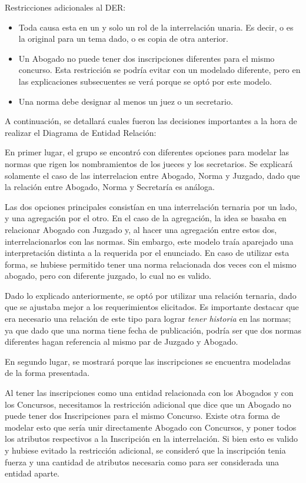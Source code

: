 Restricciones adicionales al DER:

\begin{itemize}
\item Toda causa esta en un y solo un rol de la interrelación unaria. Es decir, o es la original para un tema dado, o es copia de otra anterior.
\item Un Abogado no puede tener dos inscripciones diferentes para el mismo concurso. Esta restricción se podría evitar con un modelado diferente, pero en las explicaciones subsecuentes se verá porque se optó por este modelo.
\item Una norma debe designar al menos un juez o un secretario.
\end{itemize}



A continuación, se detallará cuales fueron las decisiones importantes a la hora de realizar el Diagrama de Entidad Relación:


En primer lugar, el grupo se encontró con diferentes opciones para modelar las normas que rigen los nombramientos de los jueces y los secretarios. 
Se explicará solamente el caso de las interrelacion entre Abogado, Norma y Juzgado, dado que la relación entre Abogado, Norma y Secretaría es análoga.

Las dos opciones principales consistían en una interrelación ternaria por un lado, y una agregación por el otro.
En el caso de la agregación, la idea se basaba en relacionar Abogado con Juzgado y, al hacer una agregación entre estos dos, interrelacionarlos con las normas. Sin embargo, este modelo traía aparejado una interpretación distinta a la requerida por el enunciado. En caso de utilizar esta forma, se hubiese permitido tener una norma relacionada dos veces con el mismo abogado, pero con diferente juzgado, lo cual no es valido. 

Dado lo explicado anteriormente, se optó por utilizar una relación ternaria, dado que se ajustaba mejor a los requerimientos elicitados. 
Es importante destacar que era necesario una relación de este tipo para lograr \textit{tener historia} en las normas; ya que dado que una norma tiene fecha de publicación, podría ser que dos normas diferentes hagan referencia al mismo par de Juzgado y Abogado.


\bigskip

En segundo lugar, se mostrará porque las inscripciones se encuentra modeladas de la forma presentada. 

Al tener las inscripciones como una entidad relacionada con los Abogados y con los Concursos, necesitamos la restricción adicional que dice que un Abogado no puede tener dos Inscripciones para el mismo Concurso. Existe otra forma de modelar esto que sería unir directamente Abogado con Concursos, y poner todos los atributos respectivos a la Inscripción en la interrelación. Si bien esto es valido y hubiese evitado la restricción adicional, se consideró que la inscripción tenia fuerza y una cantidad de atributos necesaria como para ser considerada una entidad aparte.

